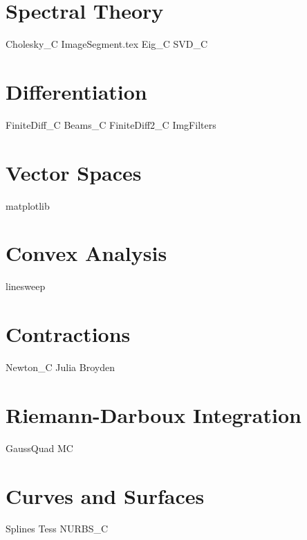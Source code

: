 \documentclass{newsiambook}
\begin{document}
\part{Spectral Theory}
{Cholesky_C}
{ImageSegment.tex}
{Eig_C}
{SVD_C}

\part{Differentiation}
{FiniteDiff_C}
{Beams_C}
{FiniteDiff2_C}
{ImgFilters}

\part{Vector Spaces}
{matplotlib}


\part{Convex Analysis}

{linesweep}

\part{Contractions}
{Newton_C}
{Julia}
{Broyden}

\part{Riemann-Darboux Integration}
{GaussQuad}
{MC}

% 

\part{Curves and Surfaces}
{Splines}
{Tess}
{NURBS_C}
\end{document}

